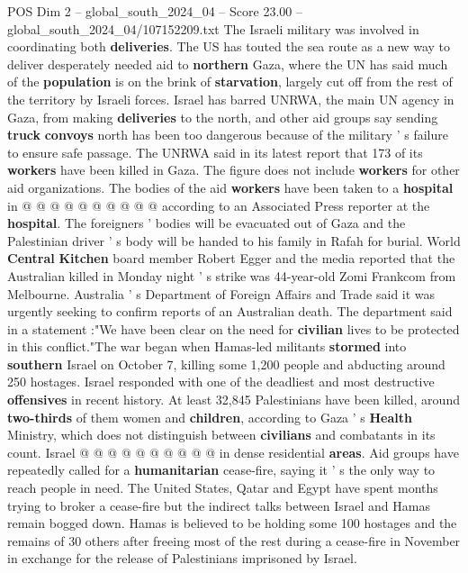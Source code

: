 \begin{textsample}{POS Dim 2 – global\_south\_2024\_04 – Score 23.00 – global\_south\_2024\_04/107152209.txt}
The Israeli military was involved in coordinating both \textbf{deliveries}.
The US has touted the sea route as a new way to deliver desperately needed aid to \textbf{northern} Gaza, where the UN has said much of the \textbf{population} is on the brink of \textbf{starvation}, largely cut off from the rest of the territory by Israeli forces.
Israel has barred UNRWA, the main UN agency in Gaza, from making \textbf{deliveries} to the north, and other aid groups say sending \textbf{truck} \textbf{convoys} north has been too dangerous because of the military ' s failure to ensure safe passage.
The UNRWA said in its latest report that 173 of its \textbf{workers} have been killed in Gaza.
The figure does not include \textbf{workers} for other aid organizations.
The bodies of the aid \textbf{workers} have been taken to a \textbf{hospital} in @ @ @ @ @ @ @ @ @ @ according to an Associated Press reporter at the \textbf{hospital}.
The foreigners ' bodies will be evacuated out of Gaza and the Palestinian driver ' s body will be handed to his family in Rafah for burial.
World \textbf{Central} \textbf{Kitchen} board member Robert Egger and the media reported that the Australian killed in Monday night ' s strike was 44-year-old Zomi Frankcom from Melbourne.
Australia ' s Department of Foreign Affairs and Trade said it was urgently seeking to confirm reports of an Australian death.
The department said in a statement :"We have been clear on the need for \textbf{civilian} lives to be protected in this conflict."The war began when Hamas-led militants \textbf{stormed} into \textbf{southern} Israel on October 7, killing some 1,200 people and abducting around 250 hostages.
Israel responded with one of the deadliest and most destructive \textbf{offensives} in recent history.
At least 32,845 Palestinians have been killed, around \textbf{two-thirds} of them women and \textbf{children}, according to Gaza ' s \textbf{Health} Ministry, which does not distinguish between \textbf{civilians} and combatants in its count.
Israel @ @ @ @ @ @ @ @ @ @ in dense residential \textbf{areas}.
Aid groups have repeatedly called for a \textbf{humanitarian} cease-fire, saying it ' s the only way to reach people in need.
The United States, Qatar and Egypt have spent months trying to broker a cease-fire but the indirect talks between Israel and Hamas remain bogged down.
Hamas is believed to be holding some 100 hostages and the remains of 30 others after freeing most of the rest during a cease-fire in November in exchange for the release of Palestinians imprisoned by Israel.

\end{textsample}
